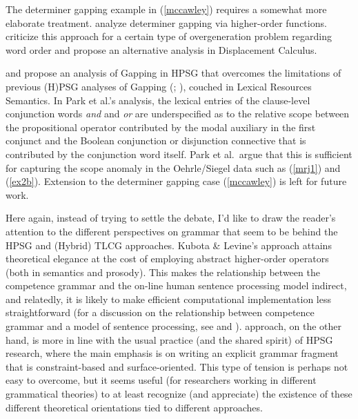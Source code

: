 \documentclass[output=paper
                ,modfonts
 	        ,biblatex
                ,babelshorthands
                ,newtxmath
                ,draftmode
                ,colorlinks, citecolor=brown
]{langscibook}
\begin{document}
The determiner gapping example in (\ref{mccawley}) requires a somewhat more
elaborate treatment. \citet{kubota-levine-gapping} analyze determiner
gapping via higher-order functions. \citet{morrillvalentin16} criticize this
approach for a certain type of overgeneration problem regarding word
order and propose an alternative analysis in Displacement Calculus.

\citet{parkea18gapping} and \citet{parkDiss} propose an analysis of Gapping in HPSG that
overcomes the limitations of previous (H)PSG analyses of Gapping
(\citealt[Section~4.3]{sgww};  \citealt{chaves05,abeille-ea}), couched in Lexical Resources Semantics.
In Park et al.'s analysis, the lexical entries of the clause-level conjunction
words \textit{and} and \textit{or} are underspecified as to the relative scope
between the propositional operator contributed by the modal auxiliary
in the first conjunct and the Boolean conjunction or disjunction
connective that is contributed by the conjunction word itself. Park et
al.\ argue that this is sufficient for capturing the scope anomaly in the
Oehrle/Siegel data such as (\ref{mrj1}) and (\ref{ex2b}). Extension to
the determiner gapping case (\ref{mccawley}) is left for future work.

Here again, instead of trying to settle the debate, I'd like to draw
the reader's attention to the different perspectives on grammar that
seem to be behind the HPSG and (Hybrid) TLCG approaches. Kubota \&
Levine's approach attains theoretical elegance at the cost of
employing abstract higher-order operators (both in semantics and
prosody). This makes the relationship between the competence grammar
and the on-line human sentence processing model indirect, and
relatedly, it is likely to make efficient computational implementation
less straightforward (for a discussion on the relationship between
competence grammar and a model of sentence processing, see
 and ).
 approach, on the 
other hand, is more in line with the usual practice (and the shared
spirit) of HPSG research, where the main emphasis is on writing an
explicit grammar fragment that is constraint-based and
surface-oriented. This type of tension is perhaps not easy to
overcome, but it seems useful (for researchers working in different
grammatical theories) to at least recognize (and appreciate) the
existence of these different theoretical orientations tied to
different approaches.
\end{document}
